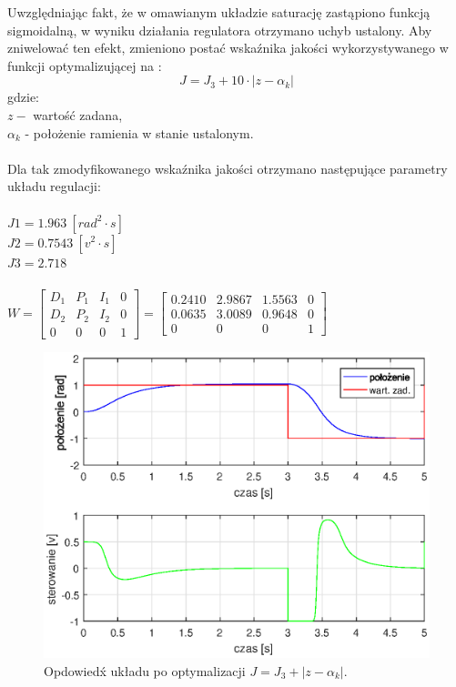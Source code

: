 Uwzględniając fakt, że w omawianym układzie saturację zastąpiono funkcją sigmoidalną, w wyniku działania regulatora otrzymano uchyb ustalony. Aby zniwelować ten efekt, zmieniono postać wska\'znika jakości wykorzystywanego w funkcji optymalizującej na :
\begin{equation}\label{key}
J = J_3 + 10 \cdot |z - \alpha_k|
\end{equation}
gdzie:\\
$z - $ wartość zadana,\\
$\alpha_k$ - położenie ramienia w stanie ustalonym.\\\\
Dla tak zmodyfikowanego wska\'znika jakości otrzymano następujące parametry układu regulacji:\\
\\
$J1 = 1.963 \ [rad^2 \cdot s]$\\
$J2 = 0.7543 \ [v^2 \cdot s] $\\
$J3 = 2.718$ \\
\\
$W = \begin{bmatrix}
	D_1& P_1& I_1&0\\
	D_2& P_2& I_2&0\\
	0&0&0&1
	\end{bmatrix} = 
	 \begin{bmatrix}
	 	0.2410&2.9867& 1.5563&0\\
	0.0635& 3.0089&0.9648&0\\
	0&0&0&1
	\end{bmatrix} 
$

\begin{figure}[h!]
	\centering
	\includegraphics[scale = 1]{fig/neural_opt_uchyb.eps}
	\caption		
	{Opdowied\'x układu po optymalizacji $J = J_3 + |z - \alpha_k|$.}
	\label{neuron_ster_opt_uchyb}
\end{figure}

